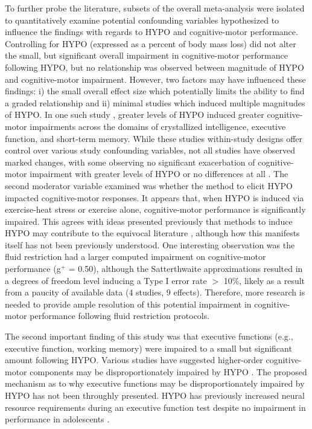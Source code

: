 To further probe the literature, subsets of the overall meta-analysis were isolated to quantitatively examine potential confounding variables hypothesized to influence the findings with regards to HYPO and cognitive-motor performance. Controlling for HYPO (expressed as a percent of body mass loss) did not alter the small, but significant overall impairment in cognitive-motor performance following HYPO, but no relationship was observed between magnitude of HYPO and cognitive-motor impairment. However, two factors may have influenced these findings: i) the small overall effect size which potentially limits the ability to find a graded relationship and ii) minimal studies which induced multiple magnitudes of HYPO. In one such study \cite{gopinathan_role_1988}, greater levels of HYPO induced greater cognitive-motor impairments across the domains of crystallized intelligence, executive function, and short-term memory. While these studies within-study designs offer control over various study confounding variables, not all studies have observed marked changes, with some observing no significant exacerbation of cognitive-motor impairment with greater levels of HYPO \cite{weber_dehydration_2013} or no differences at all \cite{baker_dehydration_2007}. The second moderator variable examined was whether the method to elicit HYPO impacted cognitive-motor responses. It appears that, when HYPO is induced via exercise-heat stress or exercise alone, cognitive-motor performance is significantly impaired. This agrees with ideas presented previously that methods to induce HYPO may contribute to the equivocal literature \cite{lieberman_methods_2012}, although how this manifests itself has not been previously understood. One interesting observation was the fluid restriction had a larger computed impairment on cognitive-motor performance (g${^+}$ = 0.50), although the Satterthwaite approximations \cite{tipton_small_2015} resulted in a degrees of freedom level inducing a Type I error rate ${>}$ 10\%, likely as a result from a paucity of available data (4 studies, 9 effects). Therefore, more research is needed to provide ample resolution of this potential impairment in cognitive-motor performance following fluid restriction protocols.    

The second important finding of this study was that executive functions (e.g., executive function, working memory) were impaired to a small but significant amount following HYPO. Various studies have suggested higher-order cognitive-motor components may be disproportionately impaired by HYPO \cite{tomporowski_effects_2007, lieberman_hydration_2007,grandjean_dehydration_2007}. The proposed mechanism as to why executive functions may be disproportionately impaired by HYPO has not been throughly presented. HYPO has previously increased neural resource requirements during an executive function test despite no impairment in performance in adolescents \cite{kempton_dehydration_2011}.  

